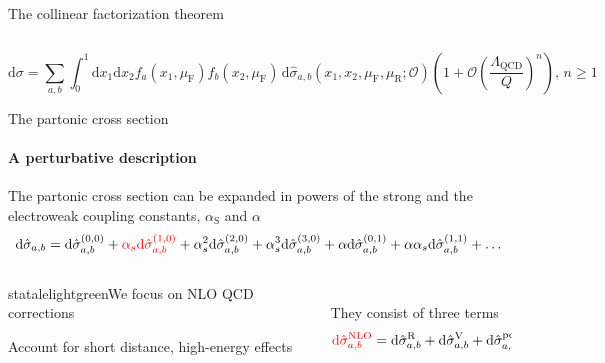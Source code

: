 \begin{frame} {The collinear factorization theorem}
\begin{columns}
\begin{column}{0.4\textwidth}
    \end{column}

    \end{columns}
    \begin{equation*}
    \text{d}\sigma=\sum_{a, b} \int_0^1 \text{d}x_1 \text{d}x_2 f_{a}(x_1, \mu_\text{F}) f_{b}(x_2,\mu_\text{F}) \, \text{d}\hat \sigma_{a,b}(x_1,x_2,\mu_\text{F},\mu_\text{R};\mathcal{O}) \left(1+ \mathcal{O}\left(\frac{\Lambda_{\text{QCD}}}{Q} \right)^n \right), \, n\geq1
    \label{fact-theor}
\end{equation*}
  
\end{frame}



\begin{frame} {The partonic cross section}
  \framesubtitle{A perturbative description}
\vspace{1em}
The partonic cross section can be expanded in powers of the strong and the electroweak coupling constants, $\alpha_{\text{S}}$ and $\alpha$
    \begin{equation*}
    \text{d} \hat{\sigma}_{a,b} = \text{d} \hat{\sigma}_{a,b}^{(0,0)} + \textcolor{red}{\alpha_s \text{d} \hat{\sigma}_{a,b}^{(1,0)}} + \alpha_s^2 \text{d} \hat{\sigma}_{a,b}^{(2,0)} + \alpha_s^3 \text{d} \hat{\sigma}_{a,b}^{(3,0)} + \alpha \text{d} \hat{\sigma}_{a,b}^{(0,1)} + \alpha \alpha_s \text{d} \hat{\sigma}_{a,b}^{(1,1)} + \dots 
    \end{equation*}

    \begin{columns}

    \begin{column}{0.6\textwidth}
    \begin{colorblock}[black]{statalelightgreen}{We focus on  NLO QCD corrections}
    \begin{center}
        Account for short distance, high-energy effects
    \end{center}
      \end{colorblock}   
    
    \end{column}

    \begin{column}{0.4\textwidth}
    \\
    They consist of three terms 
    \begin{equation*}
    \textcolor{red}{\mathrm{d} \hat{\sigma}_{a,b}^{\mathrm{NLO}}} = \mathrm{d} \hat{\sigma}_{a,b}^{\mathrm{R}} + \mathrm{d} \hat{\sigma}_{a,b}^{\mathrm{V}} + \mathrm{d} \hat{\sigma}_{a,b}^{\mathrm{pdf}}
    \end{equation*}       
    

\end{column}
\end{columns}
\end{frame}
